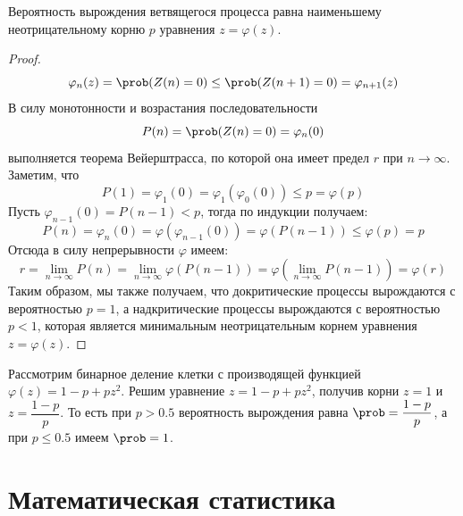\documentclass[12pt]{article}
\begin{document}
\begin{theorem}
    Вероятность вырождения ветвящегося процесса равна наименьшему неотрицательному корню $p$ уравнения $z=\varphi(z)$.
\end{theorem}
\begin{proof}
    $$\varphi_n(z)=\prob(Z(n)=0)\leq \prob(Z(n+1)=0)=\varphi_{n+1}(z)$$
    В силу монотонности и возрастания последовательности
    $$P(n)=\prob(Z(n)=0)=\varphi_n(0)$$
    выполняется теорема Вейерштрасса, по которой она имеет предел $r$ при $n\to\infty$. Заметим, что 
    $$P(1)=\varphi_1(0)=\varphi_1(\varphi_0(0))\leq p=\varphi(p)$$
    Пусть $\varphi_{n-1}(0)=P(n-1)<p$, тогда по индукции получаем:
    $$P(n)=\varphi_n(0)=\varphi(\varphi_{n-1}(0))=\varphi(P(n-1))\leq \varphi(p)=p$$
    Отсюда в силу непрерывности $\varphi$ имеем:
    $$r=\lim_{n\to\infty}P(n)=\lim_{n\to\infty}\varphi(P(n-1))=\varphi\left(\lim_{n\to\infty}P(n-1)\right)=\varphi(r)$$
    Таким образом, мы также получаем, что докритические процессы вырождаются с вероятностью $p=1$, а надкритические процессы вырождаются с вероятностью $p<1$, которая является минимальным неотрицательным корнем уравнения $z=\varphi(z)$.
\end{proof}
\begin{example}
    Рассмотрим бинарное деление клетки с производящей функцией $\varphi(z)=1-p+pz^2$. Решим уравнение $z=1-p+pz^2$, получив корни $z=1$ и $z=\dfrac{1-p}{p}$. То есть при $p>\num{0.5}$ вероятность вырождения равна $\prob=\dfrac{1-p}{p}$, а при $p\leq\num{0.5}$ имеем $\prob=1$.
\end{example}

\section{Математическая статистика}
\end{document}
